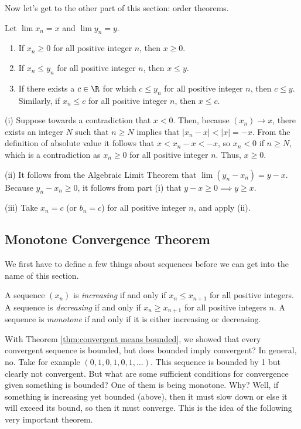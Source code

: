 \documentclass[class=article, crop=false]{standalone}
\begin{document}
Now let's get to the other part of this section: order theorems.

\begin{thm}
    Let $\lim x_n = x$ and $\lim y_n = y$.
        \begin{enumerate}[\normalfont(i)]
            \item If $x_n \geq 0$ for all positive integer $n$, then $x \geq 0$.
            \item If $x_n \leq y_n$ for all positive integer $n$, then $x \leq y$.
            \item If there exists a $c \in \R$ for which $c \leq y_n$ for all positive integer $n$, then $c \leq y$. Similarly, if $x_n \leq c$ for all positive integer $n$, then $x \leq c$.
        \end{enumerate}
\end{thm}
\begin{pf}
    (i) Suppose towards a contradiction that $x < 0$. Then, because $(x_n) \to x$, there exists an integer $N$ such that $n \geq N$ implies that $|x_n-x| < |x|=-x$. From the definition of absolute value it follows that $x < x_n - x < -x$, so $x_n < 0$ if $n \geq N$, which is a contradiction as $x_n \geq 0$ for all positive integer $n$. Thus, $x \geq 0$.

    (ii) It follows from the Algebraic Limit Theorem that $\lim (y_n-x_n) = y-x$. Because $y_n-x_n\geq 0$, it follows from part (i) that $y-x \geq 0 \implies y \geq x$.

    (iii) Take $x_n = c$ (or $b_n = c$) for all positive integer $n$, and apply (ii).
\end{pf}

\subsection{Monotone Convergence Theorem}

We first have to define a few things about sequences before we can get into the name of this section.
\begin{defn}
    A sequence $(x_n)$ is \textit{increasing} if and only if $x_n \leq x_{n+1}$ for all positive integers. A sequence is \textit{decreasing} if and only if $x_n \geq x_{n+1}$ for all positive integers $n$. A sequence is \textit{monotone} if and only if it is either increasing or decreasing.
\end{defn}

With Theorem \ref{thm:convergent means bounded}, we showed that every convergent sequence is bounded, but does bounded imply convergent? In general, no. Take for example $(0,1,0,1,0,1,\ldots)$. This sequence is bounded by 1 but clearly not convergent. But what are some sufficient conditions for convergence given something is bounded? One of them is being monotone. Why? Well, if something is increasing yet bounded (above), then it must slow down or else it will exceed its bound, so then it must converge. This is the idea of the following very important theorem.
\end{document}
